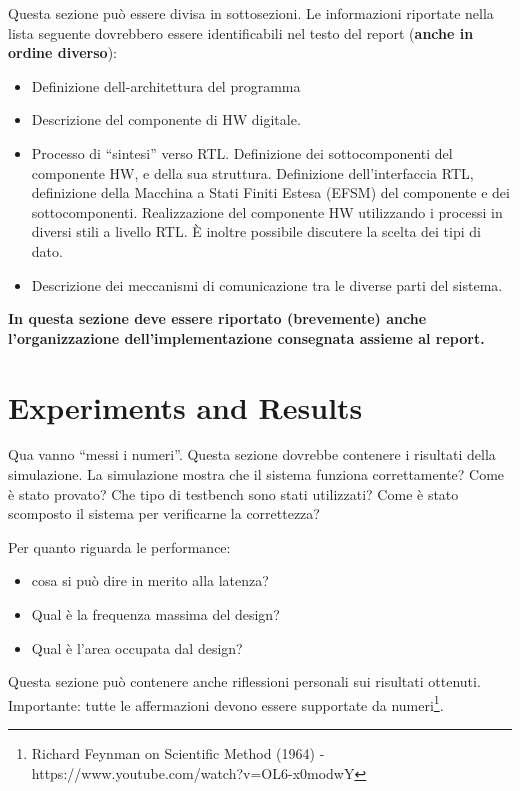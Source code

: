 \documentclass[12pt]{IEEEtran}
\begin{document}
Questa sezione pu\`o essere divisa in sottosezioni. Le informazioni riportate nella lista seguente dovrebbero essere identificabili nel testo del report (\textbf{anche in ordine diverso}):
\begin{itemize}
\item Definizione dell-architettura del programma
\item Descrizione del componente di HW digitale.
\item Processo di ``sintesi'' verso RTL. Definizione dei sottocomponenti del componente HW, e della sua struttura. Definizione dell'interfaccia RTL, definizione della Macchina a Stati Finiti Estesa (EFSM) del componente e dei sottocomponenti. Realizzazione del componente HW utilizzando i processi in diversi stili a livello RTL. \`E inoltre possibile discutere la scelta dei tipi di dato.
\item Descrizione dei meccanismi di comunicazione tra le diverse parti del sistema.
\end{itemize}

\textbf{In questa sezione deve essere riportato (brevemente) anche l'organizzazione dell'implementazione consegnata assieme al report.}

\section{Experiments and Results}

Qua vanno ``messi i numeri''. Questa sezione dovrebbe contenere i risultati della simulazione. La simulazione mostra che il sistema funziona correttamente? Come \`e stato provato? Che tipo di testbench sono stati utilizzati? Come \`e stato scomposto il sistema per verificarne la correttezza?

Per quanto riguarda le performance:
\begin{itemize}
\item cosa si pu\`o dire in merito alla latenza?
\item Qual è la frequenza massima del design? 
\item Qual è l'area occupata dal design? 
\end{itemize}

Questa sezione pu\`o contenere anche riflessioni personali sui risultati ottenuti. Importante: tutte le affermazioni devono essere supportate da numeri\footnote{Richard Feynman on Scientific Method (1964) -\\ https://www.youtube.com/watch?v=OL6-x0modwY}.
\end{document}

